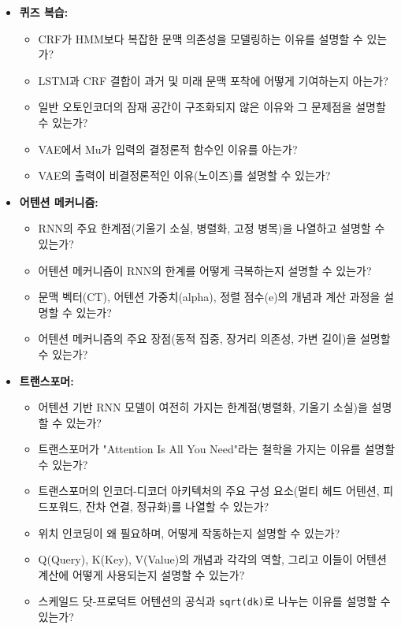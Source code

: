 \documentclass[11pt,a4paper]{article}
\theoremstyle{definition}
\begin{document}
\begin{tcolorbox}[summary, title={학습 점검 체크리스트}]
\begin{itemize}
    \item \textbf{퀴즈 복습:}
    \begin{itemize}
        \item CRF가 HMM보다 복잡한 문맥 의존성을 모델링하는 이유를 설명할 수 있는가?
        \item LSTM과 CRF 결합이 과거 및 미래 문맥 포착에 어떻게 기여하는지 아는가?
        \item 일반 오토인코더의 잠재 공간이 구조화되지 않은 이유와 그 문제점을 설명할 수 있는가?
        \item VAE에서 Mu가 입력의 결정론적 함수인 이유를 아는가?
        \item VAE의 출력이 비결정론적인 이유(노이즈)를 설명할 수 있는가?
    \end{itemize}
    \item \textbf{어텐션 메커니즘:}
    \begin{itemize}
        \item RNN의 주요 한계점(기울기 소실, 병렬화, 고정 병목)을 나열하고 설명할 수 있는가?
        \item 어텐션 메커니즘이 RNN의 한계를 어떻게 극복하는지 설명할 수 있는가?
        \item 문맥 벡터(CT), 어텐션 가중치(alpha), 정렬 점수(e)의 개념과 계산 과정을 설명할 수 있는가?
        \item 어텐션 메커니즘의 주요 장점(동적 집중, 장거리 의존성, 가변 길이)을 설명할 수 있는가?
    \end{itemize}
    \item \textbf{트랜스포머:}
    \begin{itemize}
        \item 어텐션 기반 RNN 모델이 여전히 가지는 한계점(병렬화, 기울기 소실)을 설명할 수 있는가?
        \item 트랜스포머가 "Attention Is All You Need"라는 철학을 가지는 이유를 설명할 수 있는가?
        \item 트랜스포머의 인코더-디코더 아키텍처의 주요 구성 요소(멀티 헤드 어텐션, 피드포워드, 잔차 연결, 정규화)를 나열할 수 있는가?
        \item 위치 인코딩이 왜 필요하며, 어떻게 작동하는지 설명할 수 있는가?
        \item Q(Query), K(Key), V(Value)의 개념과 각각의 역할, 그리고 이들이 어텐션 계산에 어떻게 사용되는지 설명할 수 있는가?
        \item 스케일드 닷-프로덕트 어텐션의 공식과 \texttt{sqrt(dk)}로 나누는 이유를 설명할 수 있는가?

\end{itemize}
\end{itemize}
\end{tcolorbox}
\end{document}
